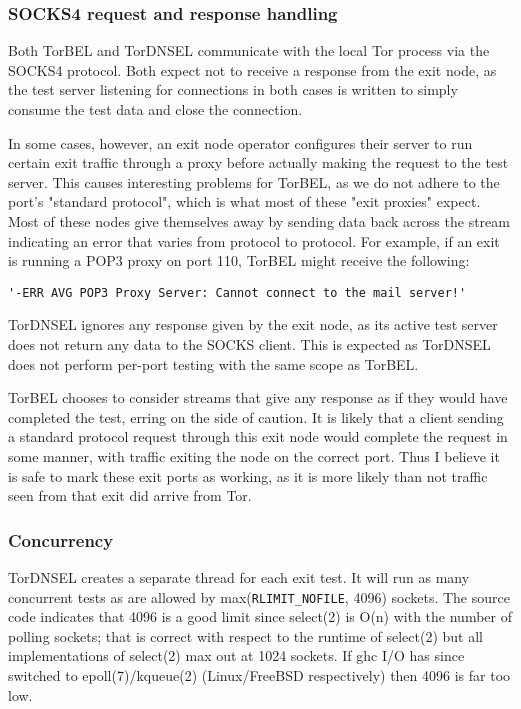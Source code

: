 \documentclass{article}
\begin{document}
\subsubsection{SOCKS4 request and response handling}
Both TorBEL and TorDNSEL communicate with the local Tor process via the 
SOCKS4 protocol.  Both expect not to receive a response from the exit
node, as the test server listening for connections in both cases is written
to simply consume the test data and close the connection.

In some cases, however, an exit node operator configures their server to run 
certain exit traffic through a proxy before actually making the request to the
test server.  This causes interesting problems for TorBEL, as we do not adhere
to the port's "standard protocol", which is what most of these "exit proxies"
expect.  Most of these nodes give themselves away by sending data back across
the stream indicating an error that varies from protocol to protocol.  For example,
if an exit is running a POP3 proxy on port 110, TorBEL might receive the following:

\begin{verbatim}
'-ERR AVG POP3 Proxy Server: Cannot connect to the mail server!'
\end{verbatim}

TorDNSEL ignores any response given by the exit node, as its active test
server does not return any data to the SOCKS client.  This is expected as
TorDNSEL does not perform per-port testing with the same scope as TorBEL.

TorBEL chooses to consider streams that give any response as if they would have
completed the test, erring on the side of caution.  It is likely that a client
sending a standard protocol request through this exit node would complete the
request in some manner, with traffic exiting the node on the correct port.
Thus I believe it is safe to mark these exit ports as working, as it is more
likely than not traffic seen from that exit did arrive from Tor.

\subsubsection{Concurrency}
TorDNSEL creates a separate thread for each exit test. It will run as
many concurrent tests as are allowed by max({\tt RLIMIT\_NOFILE}, 4096)
sockets.  The source code indicates that 4096 is a good limit since
select(2) is O(n) with the number of polling sockets; that is correct
with respect to the runtime of select(2) but all implementations of
select(2) max out at 1024 sockets.  If ghc I/O has since switched to
epoll(7)/kqueue(2) (Linux/FreeBSD respectively) then 4096 is far too
low.
\end{document}
